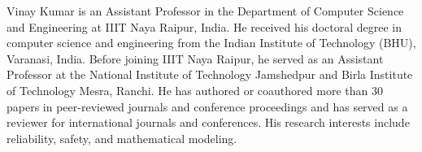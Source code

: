 \documentclass[journal]{IEEEtran}
\begin{document}
\begin{IEEEbiographynophoto}{Vinay Kumar}
is an Assistant Professor in the Department of Computer Science and Engineering at IIIT Naya Raipur, India. He received his doctoral degree in computer science and engineering from the Indian Institute of Technology (BHU), Varanasi, India. Before joining IIIT Naya Raipur, he served as an Assistant Professor at the National Institute of Technology Jamshedpur and Birla Institute of Technology Mesra, Ranchi. He has authored or coauthored more than 30 papers in peer-reviewed journals and conference proceedings and has served as a reviewer for international journals and conferences. His research interests include reliability, safety, and mathematical modeling.
\end{IEEEbiographynophoto}
\end{document}
